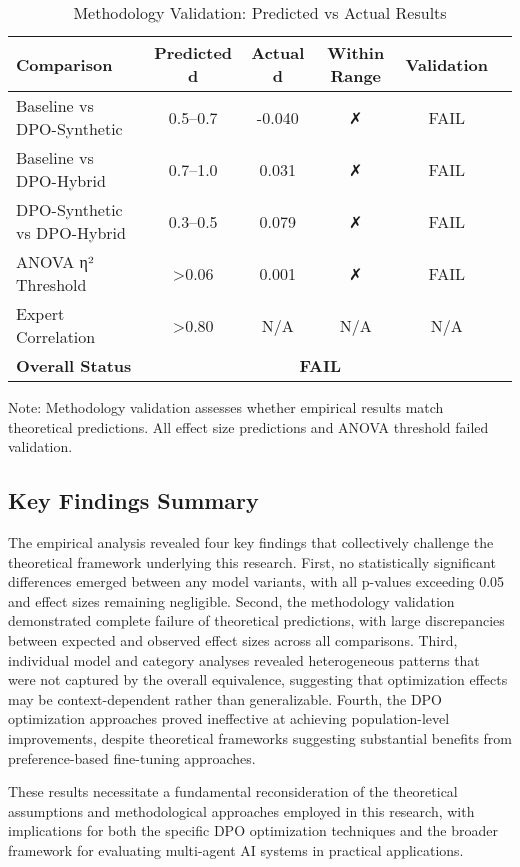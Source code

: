 \begin{table}[htbp]
\centering
\caption{Methodology Validation: Predicted vs Actual Results}
\label{tab:methodology-validation}
\begin{tabular}{lccccc}
\toprule
\textbf{Comparison} & \textbf{Predicted d} & \textbf{Actual d} & \textbf{Within Range} & \textbf{Validation} \\
\midrule
Baseline vs DPO-Synthetic    & 0.5--0.7 & -0.040 & ✗ & FAIL \\
Baseline vs DPO-Hybrid       & 0.7--1.0 & 0.031 & ✗ & FAIL \\
DPO-Synthetic vs DPO-Hybrid  & 0.3--0.5 & 0.079 & ✗ & FAIL \\
\midrule
ANOVA η² Threshold & >0.06 & 0.001 & ✗ & FAIL \\
Expert Correlation & >0.80 & N/A & N/A & N/A \\
\midrule
\textbf{Overall Status} & \multicolumn{4}{c}{\textbf{FAIL}} \\
\bottomrule
\end{tabular}
\begin{tablenotes}
\small
\item Note: Methodology validation assesses whether empirical results match theoretical predictions. All effect size predictions and ANOVA threshold failed validation.
\end{tablenotes}
\end{table}

\subsection{Key Findings Summary}

The empirical analysis revealed four key findings that collectively challenge the theoretical framework underlying this research. First, no statistically significant differences emerged between any model variants, with all p-values exceeding 0.05 and effect sizes remaining negligible. Second, the methodology validation demonstrated complete failure of theoretical predictions, with large discrepancies between expected and observed effect sizes across all comparisons. Third, individual model and category analyses revealed heterogeneous patterns that were not captured by the overall equivalence, suggesting that optimization effects may be context-dependent rather than generalizable. Fourth, the DPO optimization approaches proved ineffective at achieving population-level improvements, despite theoretical frameworks suggesting substantial benefits from preference-based fine-tuning approaches.

These results necessitate a fundamental reconsideration of the theoretical assumptions and methodological approaches employed in this research, with implications for both the specific DPO optimization techniques and the broader framework for evaluating multi-agent AI systems in practical applications.